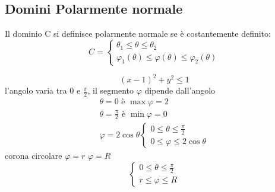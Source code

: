 \subsection{Domini Polarmente normale}
Il dominio C si definisce polarmente normale se è costantemente definito:
\begin{equation}
	C=\begin{cases}
		\theta_1\leq \theta\leq \theta_2 \\
		\varphi_1(\theta)\leq \varphi(\theta)\leq \varphi_2(\theta)
	\end{cases}
\end{equation}
\begin{esempio}
  \begin{equation}
    (x-1)^2+y^2\leq 1
  \end{equation}
  l'angolo varia tra 0 e $\frac{\pi}{2}$, il segmento $\varphi$ dipende dall'angolo
  \begin{equation*}
    \begin{matrix}
      \theta=0\text{ è } \max \varphi=2 \\
      \theta=\frac{\pi}{2} \text{ è } \min \varphi=0 \\
      \varphi=2\cos \theta
      \begin{cases}
        0\leq \theta \leq \frac{\pi}{2}\\
        0\leq \varphi\leq 2\cos \theta
      \end{cases}
    \end{matrix}
  \end{equation*}
  corona circolare $\varphi=r$ $\varphi=R$
  \begin{equation*}
    \begin{cases}
      0\leq \theta \leq \frac{\pi}{2}\\
      r\leq \varphi\leq R
    \end{cases}
  \end{equation*}
\end{esempio}
